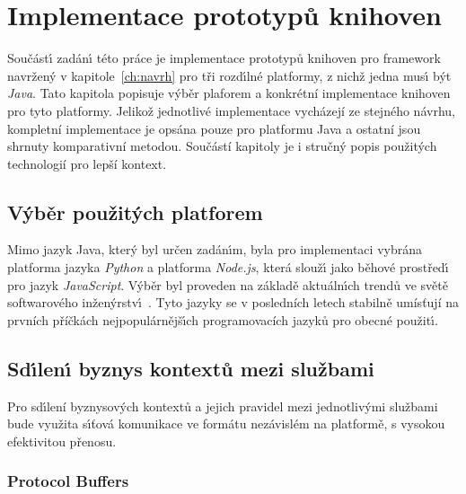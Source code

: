 

\chapter{Implementace prototypů knihoven}\label{ch:implementace}

Součást\'{\i} zadán\'{\i} této práce je implementace prototypů
knihoven pro framework navržen\'y v kapitole~\ref{ch:navrh}
pro tři rozd\'{\i}lné platformy, z nichž jedna mus\'{\i} b\'yt \textit{Java}.
Tato kapitola popisuje výběr plaforem a konkrétní implementace
knihoven pro tyto platformy. Jelikož jednotlivé implementace
vycházejí ze stejného návrhu, kompletní implementace
je opsána pouze pro platformu Java a ostatní jsou shrnuty
komparativní metodou. Součástí kapitoly je i stručný popis
použitých technologií pro lepší kontext.

\section{V\'yběr použit\'ych platforem}

Mimo jazyk Java, kter\'y byl určen zadán\'{\i}m, byla pro
implementaci vybrána platforma jazyka \textit{Python} a platforma \textit{Node.js},
která slouž\'{\i} jako běhové prostřed\'{\i} pro jazyk \textit{JavaScript}.
V\'yběr byl proveden na základě aktuáln\'{\i}ch trendů ve světě softwarového
inžen\'yrstv\'{\i}~\cite{githut}\cite{octoverse}\cite{stackoverflowsurvey}.
Tyto jazyky se v posledních letech stabilně umísťují na prvních příčkách
nejpopulárnějš\'{\i}ch programovacích jazyků pro obecné použit\'{\i}.

\section{Sd\'{\i}len\'{\i} byznys kontextů mezi službami}

Pro sd\'{\i}lení byznysových kontextů a jejich pravidel
mezi jednotliv\'ymi službami bude využita s\'{\i}ťová komunikace
ve formátu nezávislém na platformě, s vysokou efektivitou přenosu.

\subsection{Protocol Buffers}


